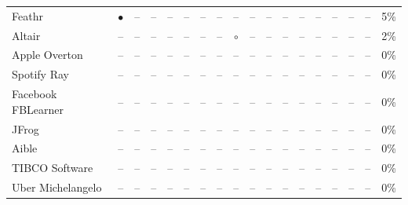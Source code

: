 \begin{landscape}
\begin{table}[p]
{\begin{tabular}{l cccc cccc cccc cccc r}
Feathr & $\bullet$ & -- & -- & -- & -- & -- & -- & -- & -- & -- & -- & -- & -- & -- & -- & -- & 5\% \\
Altair & -- & -- & -- & -- & -- & -- & -- & $\circ$ & -- & -- & -- & -- & -- & -- & -- & -- & 2\% \\
Apple Overton & -- & -- & -- & -- & -- & -- & -- & -- & -- & -- & -- & -- & -- & -- & -- & -- & 0\% \\
Spotify Ray & -- & -- & -- & -- & -- & -- & -- & -- & -- & -- & -- & -- & -- & -- & -- & -- & 0\% \\
Facebook FBLearner & -- & -- & -- & -- & -- & -- & -- & -- & -- & -- & -- & -- & -- & -- & -- & -- & 0\% \\
JFrog & -- & -- & -- & -- & -- & -- & -- & -- & -- & -- & -- & -- & -- & -- & -- & -- & 0\% \\
Aible & -- & -- & -- & -- & -- & -- & -- & -- & -- & -- & -- & -- & -- & -- & -- & -- & 0\% \\
TIBCO Software & -- & -- & -- & -- & -- & -- & -- & -- & -- & -- & -- & -- & -- & -- & -- & -- & 0\% \\
Uber Michelangelo & -- & -- & -- & -- & -- & -- & -- & -- & -- & -- & -- & -- & -- & -- & -- & -- & 0\% \\
\bottomrule
\end{tabular}}
\end{table}
\end{landscape}

